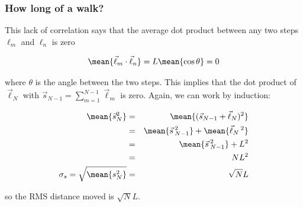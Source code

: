 \documentclass[hyperref={colorlinks=true}]{beamer}
\begin{document}
\begin{frame}%
  \frametitle{How long of a walk?}
  
  This lack of correlation says that the average dot product between any two steps $\ell_m$ and $\ell_n$ is zero
  
  \begin{equation}
    \mean{\vec{\ell}_m \cdot \vec{\ell}_n} = L \mean{\cos\theta} = 0
  \end{equation}
  
  where $\theta$ is the angle between the two steps. This implies that the dot product of $\vec{\ell}_N$ with $\vec{s}_{N-1} = \sum^{N-1}_{m=1}\vec{\ell}_m$ is zero. Again, we can work by induction:
  
  \begin{eqnarray}
    \mean{ \vec{s}^2_N }  &=& \mean{ (\vec{s}_{N-1} + \vec{\ell}_N)^2 } \\
                          &=& \mean{ \vec{s}\,^2_{N-1} } + \mean{\vec{\ell}_N\,^2} \\ 
                          &=& \mean{ \vec{s}\,^2_{N-1} } + L^2 \\ 
                          &=& N L^2 \\
    \sigma_s = \sqrt{\mean{s^2_N}} &=& \sqrt{N} L         
  \end{eqnarray}
  
  so the RMS distance moved is $\sqrt{N} L$.
  
\end{frame}

\end{document}
